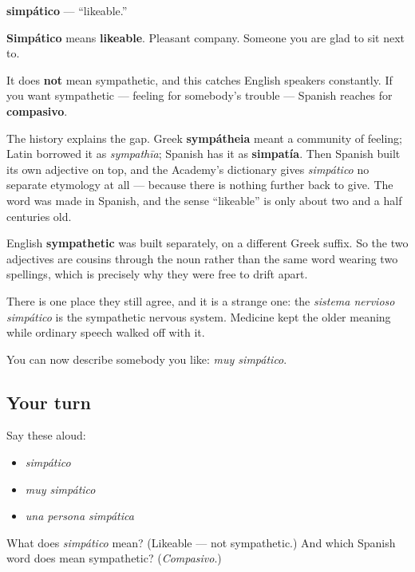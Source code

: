 \begin{cousinweb}
\textbf{simpático} — \textquotedblleft{}likeable.\textquotedblright{}

\textbf{Simpático} means \textbf{likeable}. Pleasant company. Someone you are glad to sit next to.

It does \textbf{not} mean sympathetic, and this catches English speakers constantly. If you want sympathetic — feeling for somebody's trouble — Spanish reaches for \textbf{compasivo}.

The history explains the gap. Greek \textbf{sympátheia} meant a community of feeling; Latin borrowed it as \emph{sympathīa}; Spanish has it as \textbf{simpatía}. Then Spanish built its own adjective on top, and the Academy's dictionary gives \emph{simpático} no separate etymology at all — because there is nothing further back to give. The word was made in Spanish, and the sense \textquotedblleft{}likeable\textquotedblright{} is only about two and a half centuries old.

English \textbf{sympathetic} was built separately, on a different Greek suffix. So the two adjectives are cousins through the noun rather than the same word wearing two spellings, which is precisely why they were free to drift apart.

There is one place they still agree, and it is a strange one: the \emph{sistema nervioso simpático} is the sympathetic nervous system. Medicine kept the older meaning while ordinary speech walked off with it.
\end{cousinweb}

\begin{grammarlens}[title={What you've built}]
You can now describe somebody you like: \emph{muy simpático}.
\end{grammarlens}

\subsection*{Your turn}
Say these aloud:

\begin{itemize}
\raggedright
  \item \emph{simpático}
  \item \emph{muy simpático}
  \item \emph{una persona simpática}
\end{itemize}

\begin{tcolorbox}[breakable,colback=teal!4,colframe=teal!35!black,title={Before you move on}]
What does \emph{simpático} mean? (Likeable — not sympathetic.) And which Spanish word does mean sympathetic? (\emph{Compasivo}.)
\end{tcolorbox}

